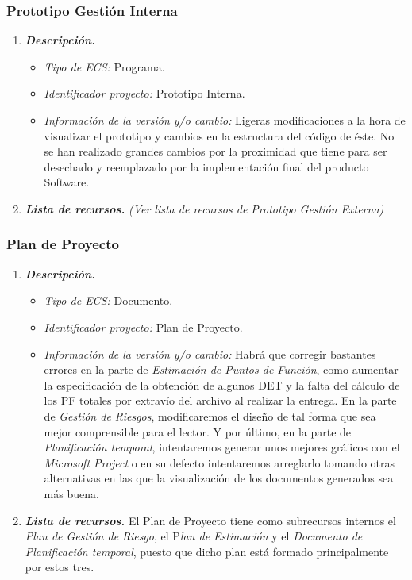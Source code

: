 \documentclass[11pt, a4paper, twoside, titlepage]{article}
\begin{document}
			\subsubsection{Prototipo Gestión Interna}
			\begin{enumerate}
				\item {\itshape \bfseries Descripción.}
						\begin{itemize}
							\item \textit{Tipo de ECS:} Programa.
							\item \textit{Identificador proyecto:} Prototipo Interna.
							\item \textit{Información de la versión y/o cambio:} Ligeras modificaciones a la hora de visualizar el prototipo y cambios en la estructura del código de éste. No se han realizado grandes cambios por la proximidad que tiene para ser desechado y reemplazado por la implementación final del producto Software.
						\end{itemize}

					\item {\itshape \bfseries Lista de recursos.}
						\textit{(Ver lista de recursos de Prototipo Gestión Externa)}
				\end{enumerate}

			\subsubsection{Plan de Proyecto}
			\begin{enumerate}
				\item {\itshape \bfseries Descripción.}
						\begin{itemize}
							\item \textit{Tipo de ECS:} Documento.
							\item \textit{Identificador proyecto:} Plan de Proyecto.
							\item \textit{Información de la versión y/o cambio:} Habrá que corregir bastantes errores en la parte de \textit{Estimación de Puntos de Función}, como aumentar la especificación de la obtención de algunos \gls{DET} y la falta del cálculo de los PF totales por extravío del archivo al realizar la entrega. En la parte de \textit{Gestión de Riesgos}, modificaremos el diseño de tal forma que sea mejor comprensible para el lector. Y por último, en la parte de \textit{Planificación temporal}, intentaremos generar unos mejores gráficos con el \textit{Microsoft Project} o en su defecto intentaremos arreglarlo tomando otras alternativas en las que la visualización de los documentos generados sea más buena.
						\end{itemize}

					\item {\itshape \bfseries Lista de recursos.}
						El Plan de Proyecto tiene como subrecursos internos el \textit{Plan de Gestión de Riesgo}, el P\textit{lan de Estimación} y el \textit{Documento de Planificación temporal}, puesto que dicho plan está formado principalmente por estos tres.
				\end{enumerate}
\end{document}
